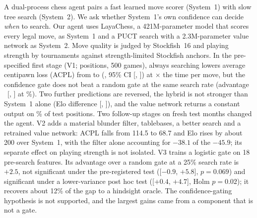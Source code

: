 A dual-process chess agent pairs a fast learned move scorer (System~1) with slow tree search (System~2). We ask whether System~1's own confidence can decide \emph{when} to search. Our agent uses LayaChess, a 421M-parameter model that scores every legal move, as System~1 and a PUCT search with a 2.3M-parameter value network as System~2. Move quality is judged by Stockfish~16 and playing strength by tournaments against strength-limited Stockfish anchors. In the pre-specified first stage (V1; \nPos{} positions, 500 games), always searching lowers average centipawn loss (ACPL) from \acplLaya{} to \acplSTwo{} (\dAcpl{}\cp, 95\% CI [\dAcplLo, \dAcplHi]) at \costRatio$\times$ the time per move, but the confidence gate does not beat a random gate at the same search rate (advantage \advFifty{}\cp\ [\advFiftyLo, \advFiftyHi] at \rateFifty\%). Two further predictions are reversed, the hybrid is not stronger than System~1 alone (Elo difference \eDHL{} [\eDHLLo, \eDHLHi]), and the value network returns a constant output on \constPct\% of test positions. Two follow-up stages on fresh test months changed the agent. V2 adds a material blunder filter, tablebases, a better search and a retrained value network: ACPL falls from 114.5 to 68.7 and Elo rises by about 200 over System~1, with the filter alone accounting for $-38.1$ of the $-45.9$\cp; its separate effect on playing strength is not isolated. V3 trains a logistic gate on 18 pre-search features. Its advantage over a random gate at a 25\% search rate is $+2.5$\cp, not significant under the pre-registered test ([$-0.9$, $+5.8$], $p=0.069$) and significant under a lower-variance post hoc test ([$+0.4$, $+4.7$], Holm $p=0.02$); it recovers about 12\% of the gap to a hindsight oracle. The confidence-gating hypothesis is not supported, and the largest gains came from a component that is not a gate.
